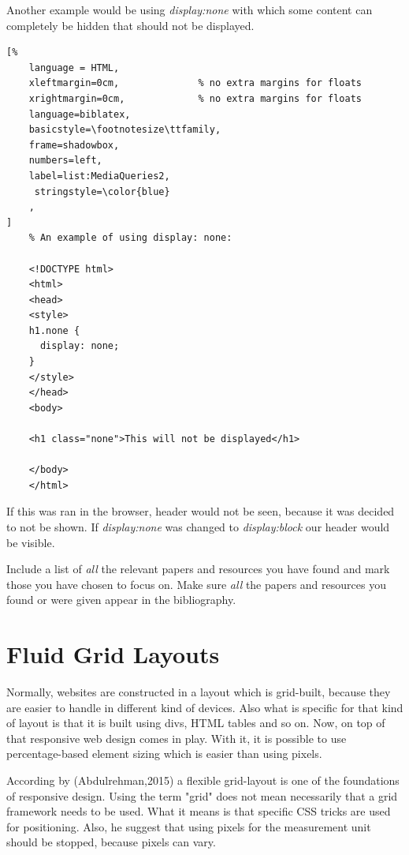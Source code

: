 Another example would be using \emph{display:none} with which some content can completely be hidden that should not be
displayed.

\begin{lstlisting}[%
    language = HTML, 
    xleftmargin=0cm,              % no extra margins for floats
    xrightmargin=0cm,             % no extra margins for floats
    language=biblatex,
    basicstyle=\footnotesize\ttfamily,
    frame=shadowbox,
    numbers=left,
    label=list:MediaQueries2,
     stringstyle=\color{blue}
    ,
]
    % An example of using display: none:

    <!DOCTYPE html>
    <html>
    <head>
    <style>
    h1.none {
      display: none;
    }
    </style>
    </head>
    <body>

    <h1 class="none">This will not be displayed</h1>

    </body>
    </html>

\end{lstlisting}




%
If this was ran in the browser, header would not be seen, because
it was decided to not be shown. If \emph{display:none} was changed to \emph{display:block}
our header would be visible.

Include a list of \emph{all} the relevant papers and resources you
have found and mark those you have chosen to focus on. Make sure
\emph{all} the papers and resources you found or were given appear in
the bibliography.




\section{Fluid Grid Layouts}

Normally, websites are constructed in a layout which is grid-built, because they are
easier to handle in different kind of devices. Also what is specific
for that kind of layout is that it is built using divs, HTML tables and so on. Now, on top of that
responsive web design comes in play\parencite{B.Frain}. With it, it is possible to use percentage-based element sizing which is easier than using pixels.

According by (Abdulrehman,2015) a flexible grid-layout is one of the foundations of responsive
design. Using the term "grid" does not mean necessarily that a grid framework needs to be used.
What it means is that specific CSS tricks are used for positioning. Also, he suggest that
using pixels for the measurement unit should be stopped, because pixels can vary.

